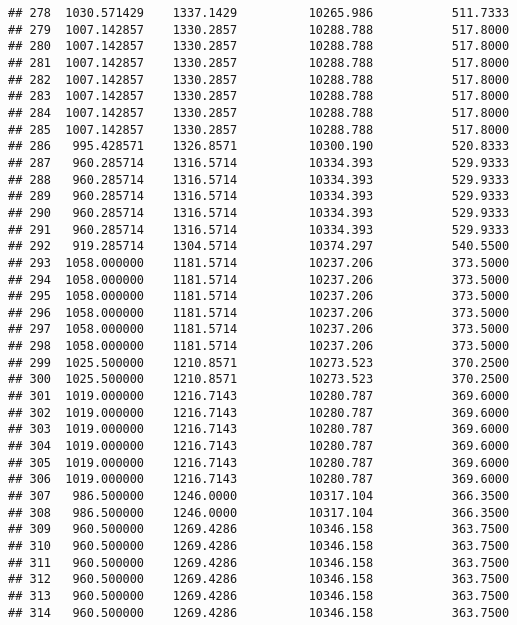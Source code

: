 \documentclass[]{article}
\begin{document}
\begin{verbatim}
## 278  1030.571429    1337.1429          10265.986           511.7333
## 279  1007.142857    1330.2857          10288.788           517.8000
## 280  1007.142857    1330.2857          10288.788           517.8000
## 281  1007.142857    1330.2857          10288.788           517.8000
## 282  1007.142857    1330.2857          10288.788           517.8000
## 283  1007.142857    1330.2857          10288.788           517.8000
## 284  1007.142857    1330.2857          10288.788           517.8000
## 285  1007.142857    1330.2857          10288.788           517.8000
## 286   995.428571    1326.8571          10300.190           520.8333
## 287   960.285714    1316.5714          10334.393           529.9333
## 288   960.285714    1316.5714          10334.393           529.9333
## 289   960.285714    1316.5714          10334.393           529.9333
## 290   960.285714    1316.5714          10334.393           529.9333
## 291   960.285714    1316.5714          10334.393           529.9333
## 292   919.285714    1304.5714          10374.297           540.5500
## 293  1058.000000    1181.5714          10237.206           373.5000
## 294  1058.000000    1181.5714          10237.206           373.5000
## 295  1058.000000    1181.5714          10237.206           373.5000
## 296  1058.000000    1181.5714          10237.206           373.5000
## 297  1058.000000    1181.5714          10237.206           373.5000
## 298  1058.000000    1181.5714          10237.206           373.5000
## 299  1025.500000    1210.8571          10273.523           370.2500
## 300  1025.500000    1210.8571          10273.523           370.2500
## 301  1019.000000    1216.7143          10280.787           369.6000
## 302  1019.000000    1216.7143          10280.787           369.6000
## 303  1019.000000    1216.7143          10280.787           369.6000
## 304  1019.000000    1216.7143          10280.787           369.6000
## 305  1019.000000    1216.7143          10280.787           369.6000
## 306  1019.000000    1216.7143          10280.787           369.6000
## 307   986.500000    1246.0000          10317.104           366.3500
## 308   986.500000    1246.0000          10317.104           366.3500
## 309   960.500000    1269.4286          10346.158           363.7500
## 310   960.500000    1269.4286          10346.158           363.7500
## 311   960.500000    1269.4286          10346.158           363.7500
## 312   960.500000    1269.4286          10346.158           363.7500
## 313   960.500000    1269.4286          10346.158           363.7500
## 314   960.500000    1269.4286          10346.158           363.7500

\end{verbatim}
\end{document}

